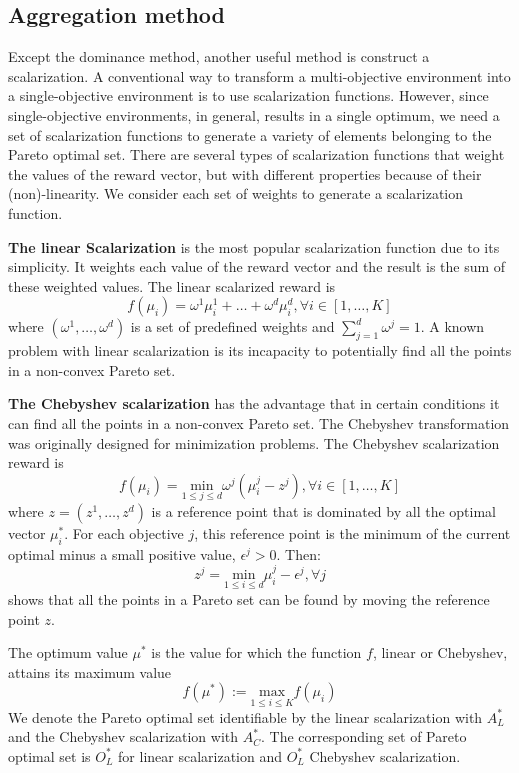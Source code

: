 \subsection{Aggregation method}
Except the dominance method, another useful method is construct a scalarization. A conventional way to transform a multi-objective environment into a single-objective environment is to use scalarization functions. However, since single-objective environments, in general, results in a single optimum, we need a set of scalarization functions to generate a variety of elements belonging to the Pareto optimal set. There are several types of scalarization functions that weight the values of the reward vector, but with different properties because of their (non)-linearity. We consider each set of weights to generate a scalarization function.

\vspace{3ex}
\textbf{The linear Scalarization} is the most popular scalarization function due to its simplicity. It weights each value of the reward vector and the result is the sum of these weighted values. The linear scalarized reward is 
\[f(\mu_i) = \omega^1 \mu_i^1+\dots+\omega^d \mu_i^d, \forall i \in [1,\dots,K]\]
where $(\omega^1,\dots,\omega^d)$ is a set of predefined weights and $\sum_{j=1}^{d}\omega^j = 1$. A known problem with linear scalarization is its incapacity to potentially find all the points in a non-convex Pareto set.

\vspace{3ex}
\textbf{The Chebyshev scalarization}\cite{miettinen2012nonlinear} has the advantage that in certain conditions it can find all the points in a non-convex Pareto set. The Chebyshev transformation was originally designed for minimization problems.  The Chebyshev scalarization reward is 
\[f(\mu_i) = \underset{1\leqslant j\leqslant d}{\text{min}} \omega^j (\mu^j_i-z^j), \forall i \in [1,\dots,K]\]
where $z=(z^1,\dots,z^d)$ is a reference point that is dominated by all the optimal vector $\mu_i^{\ast}$. For each objective $j$, this reference point is the minimum of the current optimal minus a small positive value, $\epsilon^j>0$. Then:
\begin{equation}
\label{equa:chebyshev}
z^j = \underset{1\leqslant i\leqslant d}{\text{min}} \mu_i^j-\epsilon^j, \forall j
\end{equation}
\cite{drugan2013designing} shows that all the points in a Pareto set can be found by moving the reference point $z$. 

The optimum value $\mu^{\ast}$ is the value for which the function $f$, linear or Chebyshev, attains its maximum value
\begin{equation}
\label{equa:aggregation2}
f(\mu^{\ast}) := \underset{1\leqslant i \leqslant K}{\text{max}} f(\mu_i)
\end{equation}
We denote the Pareto optimal set identifiable by the linear scalarization with $A^{\ast}_L$ and the Chebyshev scalarization with $A^{\ast}_C$. The corresponding set of Pareto optimal set is $O^{\ast}_L$ for linear scalarization and $O^{\ast}_L$ Chebyshev scalarization.


